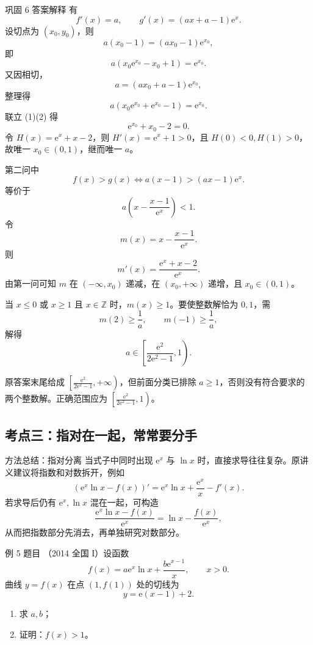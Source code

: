 ﻿\documentclass[aspectratio=169,10pt]{ctexbeamer}
\newcommand{\e}{\mathrm e}
\newcommand{\auditnote}[1]{\par\medskip{\color{Warn}\bfseries 原答案疏漏/补充：}#1}
\begin{document}
\begin{frame}[allowframebreaks]{巩固 6 答案解释}
\small
有
\[
f'(x)=a,\qquad g'(x)=(ax+a-1)\e^x.
\]
设切点为 $(x_0,y_0)$，则
\[
a(x_0-1)=(ax_0-1)\e^{x_0},
\]
即
\[
a(x_0\e^{x_0}-x_0+1)=\e^{x_0}. \tag{1}
\]
又因相切，
\[
a=(ax_0+a-1)\e^{x_0},
\]
整理得
\[
a(x_0\e^{x_0}+\e^{x_0}-1)=\e^{x_0}. \tag{2}
\]
联立 (1)(2) 得
\[
\e^{x_0}+x_0-2=0.
\]
令 $H(x)=\e^x+x-2$，则 $H'(x)=\e^x+1>0$，且 $H(0)<0,H(1)>0$，故唯一 $x_0\in(0,1)$，继而唯一 $a$。

\framebreak

第二问中
\[
f(x)>g(x)
\Longleftrightarrow
a(x-1)>(ax-1)\e^x.
\]
等价于
\[
a\left(x-\frac{x-1}{\e^x}\right)<1.
\]
令
\[
m(x)=x-\frac{x-1}{\e^x}.
\]
则
\[
m'(x)=\frac{\e^x+x-2}{\e^x}.
\]
由第一问可知 $m$ 在 $(-\infty,x_0)$ 递减，在 $(x_0,+\infty)$ 递增，且 $x_0\in(0,1)$。

当 $x\le0$ 或 $x\ge1$ 且 $x\in\mathbb Z$ 时，$m(x)\ge1$。要使整数解恰为 $0,1$，需
\[
m(2)\ge\frac1a,\qquad m(-1)\ge\frac1a,
\]
解得
\[
\boxed{a\in\left[\frac{\e^2}{2\e^2-1},1\right)}.
\]
\auditnote{原答案末尾给成 $\left[\frac{\e^2}{2\e^2-1},+\infty\right)$，但前面分类已排除 $a\ge1$，否则没有符合要求的两个整数解。正确范围应为 $\left[\frac{\e^2}{2\e^2-1},1\right)$。}
\end{frame}

\subsection{考点三：指对在一起，常常要分手}

\begin{frame}{方法总结：指对分离}
\small
当式子中同时出现 $\e^x$ 与 $\ln x$ 时，直接求导往往复杂。原讲义建议将指数和对数拆开，例如
\[
(\e^x\ln x-f(x))'=\e^x\ln x+\frac{\e^x}{x}-f'(x).
\]
若求导后仍有 $\e^x,\ln x$ 混在一起，可构造
\[
\frac{\e^x\ln x-f(x)}{\e^x}
=\ln x-\frac{f(x)}{\e^x},
\]
从而把指数部分先消去，再单独研究对数部分。
\end{frame}

\begin{frame}{例 5 题目}
\small
（2014 全国 I）设函数
\[
f(x)=a\e^x\ln x+\frac{b\e^{x-1}}x,\qquad x>0.
\]
曲线 $y=f(x)$ 在点 $(1,f(1))$ 处的切线为
\[
y=\e(x-1)+2.
\]
\begin{enumerate}
  \item 求 $a,b$；
  \item 证明：$f(x)>1$。
\end{enumerate}
\end{frame}
\end{document}

